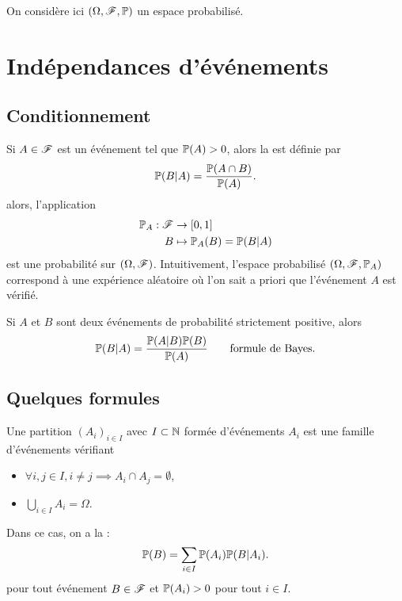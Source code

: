 
On considère ici \((\Omega, \mathscr{F}, \mathbb{P})\) un espace probabilisé.

\section{Indépendances d'événements} %

\subsection{Conditionnement} %

Si \(A\in\mathscr{F}\) est un événement tel que \(\mathbb{P}(A)>0\), alors
la 
est définie par
\begin{equation*}
    \mathbb{P}(B|A) = \frac{\mathbb{P}(A\cap B)}{\mathbb{P}(A)}.
\end{equation*}
alors, l'application
\begin{equation*}
    \begin{aligned}
        \mathbb{P}_A:\mathscr{F} & \to \mathopen{}\left[0,1\right]\mathclose{} \\
        B & \mapsto \mathbb{P}_A(B) = \mathbb{P}(B|A)
    \end{aligned}
\end{equation*}
est une probabilité sur \((\Omega, \mathscr{F})\). Intuitivement, 
l'espace probabilisé \((\Omega, \mathscr{F}, \mathbb{P}_A)\) correspond à
une expérience aléatoire où l'on sait a priori que l'événement \(A\) est vérifié.

Si \(A\) et \(B\) sont deux événements de probabilité strictement positive, alors
\begin{equation*}
    \mathbb{P}(B|A) = \frac{\mathbb{P}(A|B)\mathbb{P}(B)}{\mathbb{P}(A)} \qquad \text{formule de Bayes}.
\end{equation*}

\subsection{Quelques formules} %

Une partition \({(A_i)}_{i\in I}\) avec \(I\subset\mathbb{N}\) formée d'événements
\(A_i\) est une famille d'événements vérifiant
\begin{itemize}
    \item \(\forall i,j\in I, i\neq j \implies A_i\cap A_j = \emptyset\),
    \item \(\bigcup_{i\in I} A_i = \Omega\).
\end{itemize}
Dans ce cas, on a la :
\begin{equation*}
    \mathbb{P}(B) = \sum_{i\in I} \mathbb{P}(A_i)\mathbb{P}(B|A_i).
\end{equation*}
pour tout événement \(B\in\mathscr{F}\) et \(\mathbb{P}(A_i)>0\) pour tout \(i\in I\).

